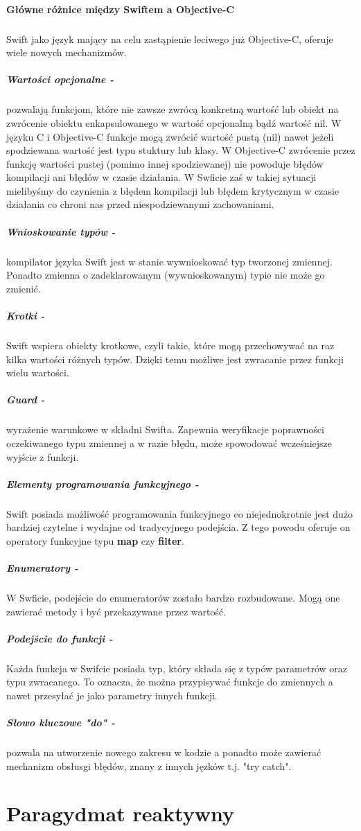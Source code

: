 \documentclass[12pt,oneside,a4paper]{report}
\begin{document}
\paragraph{Główne różnice między Swiftem a Objective-C}
\subparagraph{}Swift jako język mający na celu zastąpienie leciwego już Objective-C, oferuje wiele nowych mechanizmów.
\subparagraph{Wartości opcjonalne - } pozwalają funkcjom, które nie zawsze zwrócą konkretną wartość lub obiekt na zwrócenie obiektu enkapsulowanego w wartość opcjonalną bądź wartość nil. W języku C i Objective-C funkcje mogą zwrócić wartość pustą (nil) nawet jeżeli spodziewana wartość jest typu stuktury lub klasy. W Objective-C zwrócenie przez funkcję wartości pustej (pomimo innej spodziewanej) nie powoduje błędów kompilacji ani błędów w czasie działania. W Swficie zaś w takiej sytuacji mielibyśmy do czynienia z błędem kompilacji lub błędem krytycznym w czasie działania co chroni nas przed niespodziewanymi zachowaniami.
\subparagraph{Wnioskowanie typów - } kompilator języka Swift jest w stanie wywnioskować typ tworzonej zmiennej. Ponadto zmienna o zadeklarowanym (wywnioskowanym) typie nie może go zmienić.
\subparagraph{Krotki - } Swift wspiera obiekty krotkowe, czyli takie, które mogą przechowywać na raz kilka wartości różnych typów. Dzięki temu możliwe jest zwracanie przez funkcji wielu wartości.
\subparagraph{Guard - } wyrażenie warunkowe w składni Swifta. Zapewnia weryfikacje poprawności oczekiwanego typu zmiennej a w razie błędu, może spowodować wcześniejsze wyjście z funkcji.
\subparagraph{Elementy programowania funkcyjnego - } Swift posiada możliwość programowania funkcyjnego co niejednokrotnie jest dużo bardziej czytelne i wydajne od tradycyjnego podejścia. Z tego powodu oferuje on operatory funkcyjne typu \textbf{map} czy \textbf{filter}.       
\subparagraph{Enumeratory - } W Swficie, podejście do enumeratorów zostało bardzo rozbudowane. Mogą one zawierać metody i być przekazywane przez wartość.
\subparagraph{Podejście do funkcji - } Każda funkcja w Swifcie posiada typ, który składa się z typów parametrów oraz typu zwracanego. To oznacza, że można przypisywać funkcje do zmiennych a nawet przesyłać je jako parametry innych funkcji.
\subparagraph{Słowo kluczowe "do" - } pozwala na utworzenie nowego zakresu w kodzie a ponadto może zawierać mechanizm obsłusgi błędów, znany z innych jęzków t.j. "try catch". \cite{swiftObjcDiff}
\section{Paragydmat reaktywny}
\end{document}
